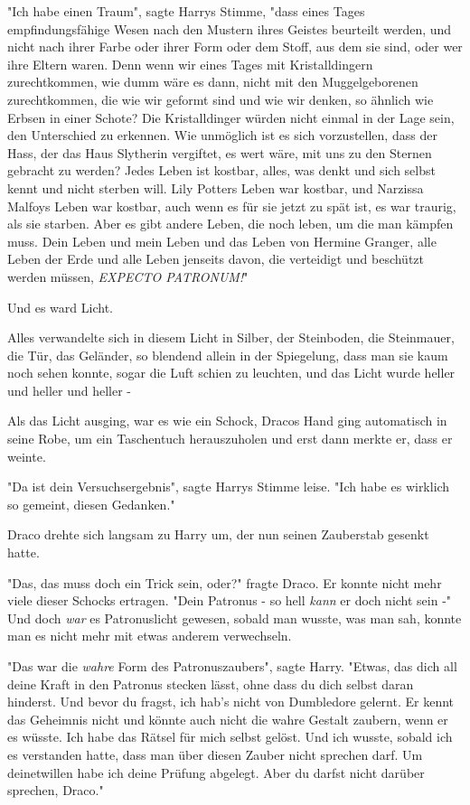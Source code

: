 {"Ich habe einen Traum", sagte Harrys Stimme, "dass eines Tages empfindungsfähige Wesen nach den Mustern ihres Geistes beurteilt werden, und nicht nach ihrer Farbe oder ihrer Form oder dem Stoff, aus dem sie sind, oder wer ihre Eltern waren. Denn wenn wir eines Tages mit Kristalldingern zurechtkommen, wie dumm wäre es dann, nicht mit den Muggelgeborenen zurechtkommen, die wie wir geformt sind und wie wir denken, so ähnlich wie Erbsen in einer Schote? Die Kristalldinger würden nicht einmal in der Lage sein, den Unterschied zu erkennen. Wie unmöglich ist es sich vorzustellen, dass der Hass, der das Haus Slytherin vergiftet, es wert wäre, mit uns zu den Sternen gebracht zu werden? Jedes Leben ist kostbar, alles, was denkt und sich selbst kennt und nicht sterben will. Lily Potters Leben war kostbar, und Narzissa Malfoys Leben war kostbar, auch wenn es für sie jetzt zu spät ist, es war traurig, als sie starben. Aber es gibt andere Leben, die noch leben, um die man kämpfen muss. Dein Leben und mein Leben und das Leben von Hermine Granger, alle Leben der Erde und alle Leben jenseits davon, die verteidigt und beschützt werden müssen, \emph{EXPECTO PATRONUM!}"

Und es ward Licht.

Alles verwandelte sich in diesem Licht in Silber, der Steinboden, die Steinmauer, die Tür, das Geländer, so blendend allein in der Spiegelung, dass man sie kaum noch sehen konnte, sogar die Luft schien zu leuchten, und das Licht wurde heller und heller und heller -

Als das Licht ausging, war es wie ein Schock, Dracos Hand ging automatisch in seine Robe, um ein Taschentuch herauszuholen und erst dann merkte er, dass er weinte.

"Da ist dein Versuchsergebnis", sagte Harrys Stimme leise. "Ich habe es wirklich so gemeint, diesen Gedanken."

Draco drehte sich langsam zu Harry um, der nun seinen Zauberstab gesenkt hatte.

"Das, das muss doch ein Trick sein, oder?" fragte Draco. Er konnte nicht mehr viele dieser Schocks ertragen. "Dein Patronus - so hell \emph{kann} er doch nicht sein -" Und doch \emph{war} es Patronuslicht gewesen, sobald man wusste, was man sah, konnte man es nicht mehr mit etwas anderem verwechseln.

"Das war die \emph{wahre} Form des Patronuszaubers", sagte Harry. "Etwas, das dich all deine Kraft in den Patronus stecken lässt, ohne dass du dich selbst daran hinderst. Und bevor du fragst, ich hab's nicht von Dumbledore gelernt. Er kennt das Geheimnis nicht und könnte auch nicht die wahre Gestalt zaubern, wenn er es wüsste. Ich habe das Rätsel für mich selbst gelöst. Und ich wusste, sobald ich es verstanden hatte, dass man über diesen Zauber nicht sprechen darf. Um deinetwillen habe ich deine Prüfung abgelegt. Aber du darfst nicht darüber sprechen, Draco."

}

